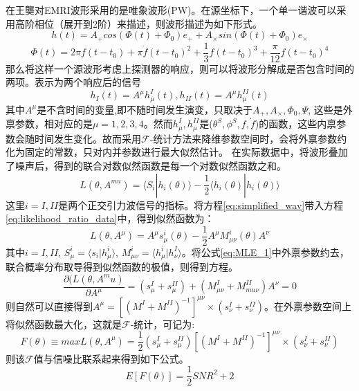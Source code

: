 在王龑\cite{wang2012extreme}对EMRI波形采用的是唯象波形(PW)。在源坐标下，一个单一谐波可以采用高阶相位（展开到2阶）来描述，则波形描述为如下形式。
\begin{equation}
h(t)=A_+ cos(\Phi(t)+\Phi_0)e_+ +A_{\times} sin(\Phi(t)+\Phi_0)e_{\times}
\end{equation}
\begin{equation}
\Phi(t)=2\pi f(t-t_0)+\pi \dot{f}(t-t_0)^2 +\frac{1}{3} f(t-t_0)^3 + \frac{\pi}{12}f(t-t_0)^4
\end{equation}
那么将这样一个源波形考虑上探测器的响应，则可以将波形分解成是否包含时间的两项。表示为两个响应后的信号
\begin{equation}
h_I(t)=A^{\mu}h_{\mu}^I(t),h_{II}(t)=A^{\mu}h_{\mu}^{II}(t)
\label{eq:simplified_wav}
\end{equation}
其中$A^{\mu}$是不含时间的变量,即不随时间发生演变，只取决于$A_+,A_{\times},\Phi_0,\Psi$, 这些是外禀参数，相对应的是$\mu=1,2,3,4$。然而$h_{\mu}^I,h_{\mu}^{II}$是($\theta^S,\phi^S,f,\dot{f}$)的函数，这些内禀参数会随时间发生变化。故而采用$\mathcal{F}$-统计方法来降维参数空间时，会将外禀参数约化为固定的常数，只对内并参数进行最大似然估计。
在实际数据中，将波形叠加了噪声后，得到的联合对数似然函数是每一个对数似然函数之和。
\begin{equation}
L(\theta,A^{mu}) =\langle S_i|h_i(\theta) \rangle -\frac{1}{2}\langle h_i(\theta) | h_i(\theta)\rangle
\label{eq:likelihood_ratio_data}
\end{equation}
这里$i=I,II$是两个正交引力波信号的指标。将方程\ref{eq:simplified_wav}带入方程\ref{eq:likelihood_ratio_data}中，得到似然函数为：
\begin{equation}
L(\theta,A^{\mu})=A^{\mu}s_{\mu}^{i}(\theta)-\frac{1}{2}A^{\mu} M^i_{\mu\nu }(\theta)A^\nu
\label{eq:MLE_1}
\end{equation}
其中$i=I,II$,
$S_\mu^i=\langle s_i |h_\mu^i\rangle$,
$M^i_{\mu\nu}=\langle h_\mu^i |h_\nu ^I \rangle$。将公式\ref{eq:MLE_1}中外禀参数约去，联合概率分布取导得到似然函数的极值，则得到方程。
\begin{equation}
\frac{\partial(L(\theta,A^mu)}{\partial A^\mu}=(s^I_{\mu}+ s^{II}_{\mu}) + (M^I_{\mu\nu}+M^{II}_{mu\nu})A^\nu =0
\end{equation}
则自然可以直接得到$A^\mu=[(M^I+M^{II})^{-1}]^{\mu\nu} \times (s^I_\nu +s^{II}_\nu)$。在外禀参数空间上将似然函数最大化，这就是$\mathcal{F}$-统计，可记为:
\begin{equation}
F(\theta) \equiv max L(\theta,A^\mu)=\frac{1}{2}(s^I_{\mu}+ s^{II}_{\mu})[(M^I+M^{II})^{-1}]^{\mu\nu} \times (s^I_\nu +s^{II}_\nu)
\end{equation}
则该$\mathcal{F}$值与信噪比联系起来得到如下公式。
\begin{equation}
E[F(\theta)] = \frac{1}{2} SNR^2 +2
\end{equation}

